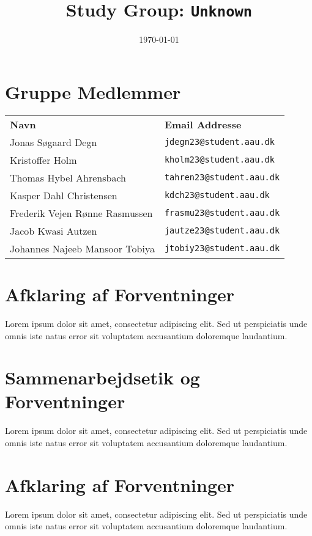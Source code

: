 \documentclass{article}
\begin{document}
\title{Study Group: \texttt{Unknown}}
\date{\today}
\maketitle

\section*{Gruppe Medlemmer}
\begin{tabular}{ll}
\textbf{Navn} & \textbf{Email Addresse} \\
Jonas Søgaard Degn & \texttt{jdegn23@student.aau.dk} \\
Kristoffer Holm & \texttt{kholm23@student.aau.dk} \\
Thomas Hybel Ahrensbach & \texttt{tahren23@student.aau.dk} \\
Kasper Dahl Christensen & \texttt{kdch23@student.aau.dk} \\
Frederik Vejen Rønne Rasmussen & \texttt{frasmu23@student.aau.dk} \\
Jacob Kwasi Autzen & \texttt{jautze23@student.aau.dk} \\
Johannes Najeeb Mansoor Tobiya & \texttt{jtobiy23@student.aau.dk} \\
\end{tabular}



\section*{Afklaring af Forventninger}
Lorem ipsum dolor sit amet, consectetur adipiscing elit. Sed ut perspiciatis unde omnis iste natus error sit voluptatem accusantium doloremque laudantium.


\section*{Sammenarbejdsetik og Forventninger}
Lorem ipsum dolor sit amet, consectetur adipiscing elit. Sed ut perspiciatis unde omnis iste natus error sit voluptatem accusantium doloremque laudantium.


\section*{Afklaring af Forventninger}
Lorem ipsum dolor sit amet, consectetur adipiscing elit. Sed ut perspiciatis unde omnis iste natus error sit voluptatem accusantium doloremque laudantium.
\end{document}
